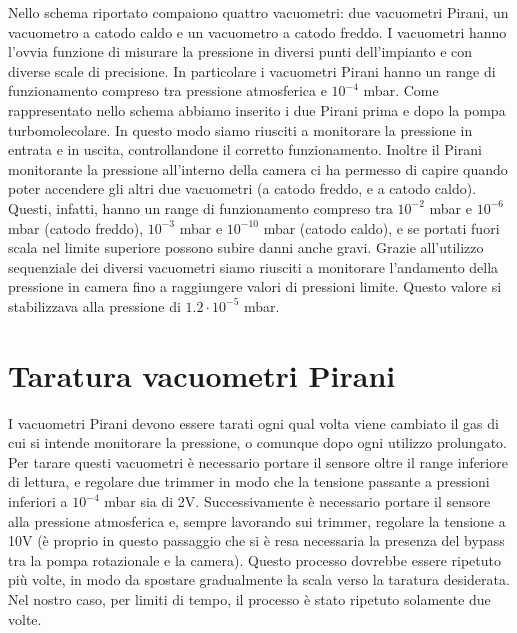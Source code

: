 \documentclass[11pt]{article}
\begin{document}
  \hspace*{5mm}Nello schema riportato compaiono quattro vacuometri: due vacuometri Pirani, un vacuometro a catodo caldo e un vacuometro a catodo freddo. I vacuometri hanno l'ovvia funzione di misurare la pressione in diversi punti dell'impianto e con diverse scale di precisione. In particolare i vacuometri Pirani hanno un range di funzionamento compreso tra pressione atmosferica e $10^{-4}$ mbar. Come rappresentato nello schema abbiamo inserito i due Pirani prima e dopo la pompa turbomolecolare. In questo modo siamo riusciti a monitorare la pressione in entrata e in uscita, controllandone il corretto funzionamento. Inoltre il Pirani monitorante la pressione all'interno della camera ci ha permesso di capire quando poter accendere gli altri due vacuometri (a catodo freddo, e a catodo caldo). Questi, infatti, hanno un range di funzionamento compreso tra $10^{-2}$ mbar e $10^{-6}$ mbar (catodo freddo), $10^{-3}$ mbar e $10^{-10}$ mbar (catodo caldo), e se portati fuori scala nel limite superiore possono subire danni anche gravi. Grazie all'utilizzo sequenziale dei diversi vacuometri siamo riusciti a monitorare l'andamento della pressione in camera fino a raggiungere valori di pressioni limite. Questo valore si stabilizzava alla pressione di $1.2\cdot10^{-5}$ mbar.
\section{Taratura vacuometri Pirani}
I vacuometri Pirani devono essere tarati ogni qual volta viene cambiato il gas di cui si intende monitorare la pressione, o comunque dopo ogni utilizzo prolungato. Per tarare questi vacuometri è necessario portare il sensore oltre il range inferiore di lettura, e regolare due trimmer in modo che la tensione passante a pressioni inferiori a $10^{-4}$ mbar sia di 2V. Successivamente è necessario portare il sensore alla pressione atmosferica e, sempre lavorando sui trimmer, regolare la tensione a 10V (è proprio in questo passaggio che si è resa necessaria la presenza del bypass tra la pompa rotazionale e la camera). Questo processo dovrebbe essere ripetuto più volte, in modo da spostare gradualmente la scala verso la taratura desiderata. Nel nostro caso, per limiti di tempo, il processo è stato ripetuto solamente due volte.  
\end{document}

